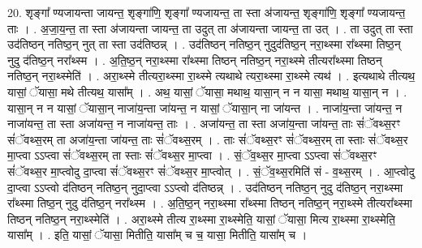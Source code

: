 \documentclass[17pt]{extarticle}
\begin{document}
20. शृङ्गा᳚ ण्यजायन्ता जायन्त॒ शृङ्गा॑णि॒ शृङ्गा᳚ ण्यजायन्त॒ ता स्ता अ॑जायन्त॒ शृङ्गा॑णि॒ शृङ्गा᳚ 
ण्यजायन्त॒ ताः । . अ॒जा॒य॒न्त॒ ता स्ता अ॑जायन्ता जायन्त॒ ता उदुत् ता अ॑जायन्ता जायन्त॒ ता उत् । . ता उदुत् ता स्ता उद॑तिष्ठन् नतिष्ठ॒न् नुत् ता स्ता उद॑तिष्ठन्न् । . उद॑तिष्ठन् नतिष्ठ॒न् नुदुद॑तिष्ठ॒न् नरा॒थ्स्मा रा᳚थ्स्मा तिष्ठ॒न् नुदु द॑तिष्ठ॒न् नरा᳚थ्स्म । . अ॒ति॒ष्ठ॒न् नरा॒थ्स्मा रा᳚थ्स्मा तिष्ठन् नतिष्ठ॒न् नरा॒थ्स्मे तीत्यरा᳚थ्स्मा तिष्ठन् नतिष्ठ॒न् नरा॒थ्स्मेति॑ । . अरा॒थ्स्मे तीत्यरा॒थ्स्मा रा॒थ्स्मे त्यथाथे त्यरा॒थ्स्मा रा॒थ्स्मे त्यथ॑ । . इत्यथाथे तीत्यथ॒ यासां॒ ॅयासा॒ मथे तीत्यथ॒ यासा᳚म् । . अथ॒ यासां॒ ॅयासा॒ मथाथ॒ यासा॒न् न न यासा॒ मथाथ॒ यासा॒न् न । . यासा॒न् न न यासां॒ ॅयासा॒न् नाजा॑य॒न्ता जा॑यन्त॒ न यासां॒ ॅयासा॒न् ना जा॑यन्त । . नाजा॑य॒न्ता जा॑यन्त॒ न नाजा॑यन्त॒ ता स्ता अजा॑यन्त॒ न नाजा॑यन्त॒ ताः । . अजा॑यन्त॒ ता स्ता अजा॑य॒न्ता जा॑यन्त॒ ताः सं॑ॅवथ्स॒रꣳ सं॑ॅवथ्स॒रम् ता अजा॑य॒न्ता जा॑यन्त॒ ताः सं॑ॅवथ्स॒रम् । . ताः सं॑ॅवथ्स॒रꣳ सं॑ॅवथ्स॒रम् ता स्ताः सं॑ॅवथ्स॒र मा॒प्त्वा ऽऽप्त्वा सं॑ॅवथ्स॒रम् ता स्ताः सं॑ॅवथ्स॒र मा॒प्त्वा । . सं॒ॅव॒थ्स॒र मा॒प्त्वा ऽऽप्त्वा सं॑ॅवथ्स॒रꣳ सं॑ॅवथ्स॒र मा॒प्त्वोदु दा॒प्त्वा सं॑ॅवथ्स॒रꣳ सं॑ॅवथ्स॒र मा॒प्त्वोत् । . सं॒ॅव॒थ्स॒रमिति॑ सं - व॒थ्स॒रम् । . आ॒प्त्वोदु दा॒प्त्वा ऽऽप्त्वो द॑तिष्ठन् नतिष्ठ॒न् नुदा॒प्त्वा ऽऽप्त्वो द॑तिष्ठन्न् । . उद॑तिष्ठन् नतिष्ठ॒न् नुदु द॑तिष्ठ॒न् नरा॒थ्स्मा रा᳚थ्स्मा तिष्ठ॒न् नुदु द॑तिष्ठ॒न् नरा᳚थ्स्म । . अ॒ति॒ष्ठ॒न् नरा॒थ्स्मा रा᳚थ्स्मा तिष्ठन् नतिष्ठ॒न् नरा॒थ्स्मे तीत्यरा᳚थ्स्मा तिष्ठन् नतिष्ठ॒न् नरा॒थ्स्मेति॑ । . अरा॒थ्स्मे तीत्य रा॒थ्स्मा रा॒थ्स्मेति॒ यासां॒ ॅयासा॒ मित्य रा॒थ्स्मा रा॒थ्स्मेति॒ यासा᳚म् । . इति॒ यासां॒ ॅयासा॒ मितीति॒ यासा᳚म् च च॒ यासा॒ मितीति॒ यासा᳚म् च । \newline
\end{document}
